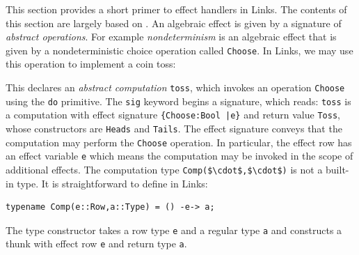 \documentclass[12pt,mscres,cdtppar,twoside,openright,logo,rightchapter,normalheadings]{infthesis}
\newcommand{\snippet}[1]{}
\theoremstyle{definition}
\begin{document}
This section provides a short primer to effect handlers in Links. The
contents of this section are largely based on
\cite{Hillerstrom2016b}. An algebraic effect is given by a signature
of \emph{abstract operations}. For example \emph{nondeterminism} is an
algebraic effect that is given by a nondeterministic choice operation
called \lstinline$Choose$. In Links, we may use this operation to
implement a coin toss:
%
\snippet{toss.links}
%
This declares an \emph{abstract computation} \lstinline$toss$, which
invokes an operation \lstinline$Choose$ using the \lstinline$do$
primitive.  The \lstinline$sig$ keyword begins a signature, which
reads: \lstinline$toss$ is a computation with effect signature
\lstinline${Choose:Bool |e}$ and return value \lstinline$Toss$, whose
constructors are \lstinline$Heads$ and \lstinline$Tails$.  
The effect signature conveys that the computation may perform the
\lstinline$Choose$ operation. In particular, the effect row has an
effect variable \lstinline$e$ which means the computation may be
invoked in the scope of additional effects.
%
The computation type \lstinline[mathescape]!Comp($\cdot$,$\cdot$)! is
not a built-in type. It is straightforward to define in Links:
%
\begin{lstlisting}
typename Comp(e::Row,a::Type) = () -e-> a;
\end{lstlisting}
%
The type constructor takes a row type \lstinline$e$ and a regular type
\lstinline$a$ and constructs a thunk with effect row \lstinline$e$ and
return type \lstinline$a$.
\end{document}
